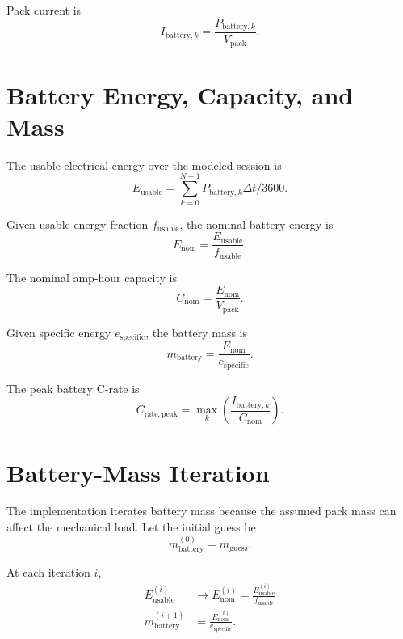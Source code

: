\documentclass[11pt]{article}
\begin{document}
Pack current is
\begin{equation}
I_{\mathrm{battery},k} = \frac{P_{\mathrm{battery},k}}{V_{\mathrm{pack}}}.
\end{equation}

\section{Battery Energy, Capacity, and Mass}
The usable electrical energy over the modeled session is
\begin{equation}
E_{\mathrm{usable}} = \sum_{k=0}^{N-1} P_{\mathrm{battery},k}\Delta t / 3600.
\end{equation}

Given usable energy fraction \(f_{\mathrm{usable}}\), the nominal battery energy is
\begin{equation}
E_{\mathrm{nom}} = \frac{E_{\mathrm{usable}}}{f_{\mathrm{usable}}}.
\end{equation}

The nominal amp-hour capacity is
\begin{equation}
C_{\mathrm{nom}} = \frac{E_{\mathrm{nom}}}{V_{\mathrm{pack}}}.
\end{equation}

Given specific energy \(e_{\mathrm{specific}}\), the battery mass is
\begin{equation}
m_{\mathrm{battery}} = \frac{E_{\mathrm{nom}}}{e_{\mathrm{specific}}}.
\end{equation}

The peak battery C-rate is
\begin{equation}
C_{\mathrm{rate,peak}} = \max_k \left( \frac{I_{\mathrm{battery},k}}{C_{\mathrm{nom}}} \right).
\end{equation}

\section{Battery-Mass Iteration}
The implementation iterates battery mass because the assumed pack mass can affect the mechanical load. Let the initial guess be
\begin{equation}
m_{\mathrm{battery}}^{(0)} = m_{\mathrm{guess}}.
\end{equation}

At each iteration \(i\),
\begin{align}
E_{\mathrm{usable}}^{(i)} &\rightarrow E_{\mathrm{nom}}^{(i)} = \frac{E_{\mathrm{usable}}^{(i)}}{f_{\mathrm{usable}}} \\
m_{\mathrm{battery}}^{(i+1)} &= \frac{E_{\mathrm{nom}}^{(i)}}{e_{\mathrm{specific}}}.
\end{align}
\end{document}
